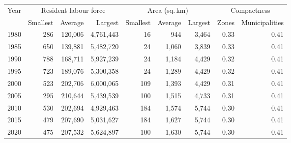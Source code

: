 \begin{tabular}{lrrrrrrrr}
\toprule
Year & \multicolumn{3}{c}{Resident labour force} & \multicolumn{3}{c}{Area (sq.\,km)} & \multicolumn{2}{c}{Compactness} \\\cmidrule(lr){2-4} \cmidrule(lr){5-7} \cmidrule(lr){8-9} & Smallest & Average & Largest & Smallest & Average & Largest & Zones & Municipalities \\
\midrule
1980 & 286 & 120,006 & 4,761,443 & 16 & 944 & 3,464 & 0.33 & 0.41 \\
1985 & 650 & 139,881 & 5,482,720 & 24 & 1,060 & 3,839 & 0.33 & 0.41 \\
1990 & 788 & 168,711 & 5,927,239 & 24 & 1,184 & 4,429 & 0.32 & 0.41 \\
1995 & 723 & 189,076 & 5,300,358 & 24 & 1,289 & 4,429 & 0.32 & 0.41 \\
2000 & 523 & 202,706 & 6,000,065 & 109 & 1,393 & 4,429 & 0.31 & 0.41 \\
2005 & 295 & 210,644 & 5,439,539 & 100 & 1,515 & 4,733 & 0.31 & 0.41 \\
2010 & 530 & 202,694 & 4,929,463 & 184 & 1,574 & 5,744 & 0.30 & 0.41 \\
2015 & 479 & 207,690 & 5,031,627 & 184 & 1,627 & 5,744 & 0.30 & 0.41 \\
2020 & 475 & 207,532 & 5,624,897 & 100 & 1,630 & 5,744 & 0.30 & 0.41 \\
\bottomrule
\end{tabular}
